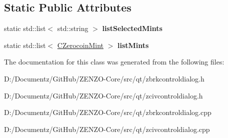 \subsection*{Static Public Attributes}
\begin{DoxyCompactItemize}
\item 
\mbox{\label{class_z_z_n_z_control_dialog_af42688a67f1682c98437c948d09ba0e3}} 
static std\+::list$<$ std\+::string $>$ {\bfseries list\+Selected\+Mints}
\item 
\mbox{\label{class_z_z_n_z_control_dialog_a3d66205e6c9805c97357a092bf5dd94b}} 
static std\+::list$<$ \mbox{\hyperlink{class_c_zerocoin_mint}{C\+Zerocoin\+Mint}} $>$ {\bfseries list\+Mints}
\end{DoxyCompactItemize}


The documentation for this class was generated from the following files\+:\begin{DoxyCompactItemize}
\item 
D\+:/\+Documentz/\+Git\+Hub/\+Z\+E\+N\+Z\+O-\/\+Core/src/qt/zbrkcontroldialog.\+h\item 
D\+:/\+Documentz/\+Git\+Hub/\+Z\+E\+N\+Z\+O-\/\+Core/src/qt/zcivcontroldialog.\+h\item 
D\+:/\+Documentz/\+Git\+Hub/\+Z\+E\+N\+Z\+O-\/\+Core/src/qt/zbrkcontroldialog.\+cpp\item 
D\+:/\+Documentz/\+Git\+Hub/\+Z\+E\+N\+Z\+O-\/\+Core/src/qt/zcivcontroldialog.\+cpp\end{DoxyCompactItemize}
